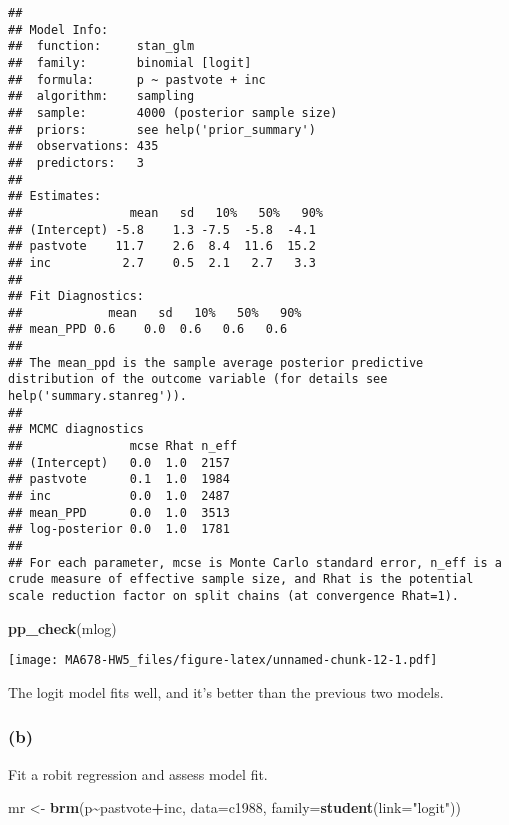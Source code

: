 \documentclass[
]{article}
\newenvironment{Shaded}{\begin{snugshade}}{\end{snugshade}}
\newcommand{\AttributeTok}[1]{\textcolor[rgb]{0.13,0.29,0.53}{#1}}
\newcommand{\FunctionTok}[1]{\textcolor[rgb]{0.13,0.29,0.53}{\textbf{#1}}}
\newcommand{\NormalTok}[1]{#1}
\newcommand{\OtherTok}[1]{\textcolor[rgb]{0.56,0.35,0.01}{#1}}
\newcommand{\SpecialCharTok}[1]{\textcolor[rgb]{0.81,0.36,0.00}{\textbf{#1}}}
\newcommand{\StringTok}[1]{\textcolor[rgb]{0.31,0.60,0.02}{#1}}
\begin{document}
\begin{verbatim}
## 
## Model Info:
##  function:     stan_glm
##  family:       binomial [logit]
##  formula:      p ~ pastvote + inc
##  algorithm:    sampling
##  sample:       4000 (posterior sample size)
##  priors:       see help('prior_summary')
##  observations: 435
##  predictors:   3
## 
## Estimates:
##               mean   sd   10%   50%   90%
## (Intercept) -5.8    1.3 -7.5  -5.8  -4.1 
## pastvote    11.7    2.6  8.4  11.6  15.2 
## inc          2.7    0.5  2.1   2.7   3.3 
## 
## Fit Diagnostics:
##            mean   sd   10%   50%   90%
## mean_PPD 0.6    0.0  0.6   0.6   0.6  
## 
## The mean_ppd is the sample average posterior predictive distribution of the outcome variable (for details see help('summary.stanreg')).
## 
## MCMC diagnostics
##               mcse Rhat n_eff
## (Intercept)   0.0  1.0  2157 
## pastvote      0.1  1.0  1984 
## inc           0.0  1.0  2487 
## mean_PPD      0.0  1.0  3513 
## log-posterior 0.0  1.0  1781 
## 
## For each parameter, mcse is Monte Carlo standard error, n_eff is a crude measure of effective sample size, and Rhat is the potential scale reduction factor on split chains (at convergence Rhat=1).
\end{verbatim}

\begin{Shaded}
\begin{Highlighting}[]
\FunctionTok{pp\_check}\NormalTok{(mlog)}
\end{Highlighting}
\end{Shaded}

\texttt{[image: MA678-HW5\_files/figure-latex/unnamed-chunk-12-1.pdf]}

The logit model fits well, and it's better than the previous two models.

\hypertarget{b-3}{%
\subsubsection{(b)}\label{b-3}}

Fit a robit regression and assess model fit.

\begin{Shaded}
\begin{Highlighting}[]
\NormalTok{mr }\OtherTok{\textless{}{-}} \FunctionTok{brm}\NormalTok{(p}\SpecialCharTok{\textasciitilde{}}\NormalTok{pastvote}\SpecialCharTok{+}\NormalTok{inc, }\AttributeTok{data=}\NormalTok{c1988, }\AttributeTok{family=}\FunctionTok{student}\NormalTok{(}\AttributeTok{link=}\StringTok{"logit"}\NormalTok{))}
\end{Highlighting}
\end{Shaded}
\end{document}
